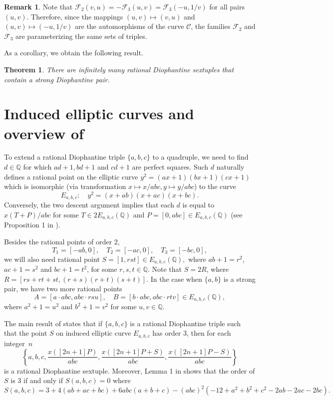 \documentclass[a4paper]{amsart}
\theoremstyle{plain}
\newtheorem{theorem}{Theorem}
\def\Q{\mathbb{Q}}
\theoremstyle{definition}
\newtheorem{remark}{Remark}
\begin{document}
\begin{remark}\label{rem:1}
	Note that $\mathcal{F}_2(v,u)=-\mathcal{F}_3(u,v)=\mathcal{F}_3(-u,1/v)$ for all pairs $(u,v)$. Therefore, since the mappings $(u,v)\mapsto (v,u)$ and $(u,v)\mapsto (-u,1/v)$ are the automorphisms of the curve $\mathcal{C}$, the families $\mathcal{F}_2$ and $\mathcal{F}_3$ are parameterizing the same sets of triples.
\end{remark}
As a corollary, we obtain the following result.

\begin{theorem}
	There are infinitely many rational Diophantine sextuples that contain a strong Diophantine pair.
\end{theorem}

\section{Induced elliptic curves and overview of \cite{DKMS}}\label{sec:induced}

To extend a rational Diophantine triple $\{a,b,c\}$ to a quadruple, we need to find $d\in \Q$ for which
$ad+1, bd+1$ and $cd+1$ are perfect squares. Such $d$ naturally defines a rational point on the elliptic curve $y^2=(ax+1)(bx+1)(cx+1)$ which
is isomorphic (via transformation $x\mapsto x/abc, y\mapsto y/abc$) to the curve
$$E_{a,b,c}:\quad y^2=(x+ab)(x+ac)(x+bc).$$
Conversely, the two descent argument implies that each $d$ is equal to $x(T+P)/abc$ for some $T\in 2E_{a,b,c}(\Q)$ and $P=[0,abc]\in E_{a,b,c}(\Q) $ (see Proposition 1 in \cite{duje-bordo}).

Besides the rational points of order $2$, $$T_1=[-ab,0],\quad T_2=[-ac,0], \quad T_3=[-bc,0],$$ we will also need rational point
$S=[1,rst]\in E_{a,b,c}(\Q),$
where $ab+1=r^2$, $ac+1=s^2$ and $bc+1=t^2$, for some $r,s,t \in \Q$.
Note that $S=2R$, where $R=[rs+rt+st,(r+s)(r+t)(s+t)]$. In the case when $\{a,b\}$ is a strong pair, we have two more rational points
$$A=[a\cdot abc,abc\cdot rsu], \quad B=[b \cdot abc,abc \cdot rtv]\in E_{a,b,c}(\Q),$$
where  $a^2+1=u^2$ and $b^2+1=v^2$ for some $u,v \in \Q$.

The main result of \cite{DKMS} states that if $\{a,b,c\}$ is a rational Diophantine triple such that the point $S$ on induced elliptic curve $E_{a,b,c}$ has order $3$, then for each integer~$n$
$$\left\{a,b,c,\frac{x([2n+1]P)}{abc},\frac{x([2n+1]P+S)}{abc},\frac{x([2n+1]P-S)}{abc}\right\}$$
is a rational Diophantine sextuple. Moreover, Lemma 1 in \cite{DKMS} shows that the order of $S$ is $3$ if and only if $S(a,b,c)=0$ where
$$S(a,b,c)=3+4(ab+ac+bc)+6abc(a+b+c)-(abc)^2(-12+a^2 + b^2 + c^2 - 2ab - 2ac - 2bc).$$
\end{document}

